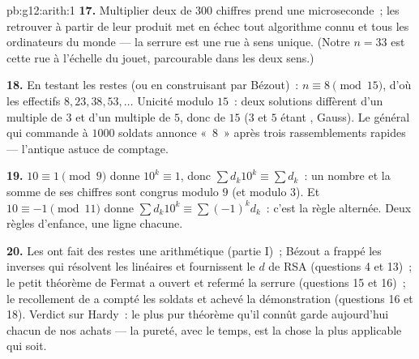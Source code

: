 \begin{solution}{pb:g12:arith:1}
\textbf{17.} Multiplier deux  de $300$ chiffres
prend une microseconde~; les retrouver à partir de leur produit met
en échec tout algorithme connu et tous les ordinateurs du monde ---
la serrure est une rue à sens unique. (Notre $n = 33$ est cette rue
à l'échelle du jouet, parcourable dans les deux sens.)

\textbf{18.} En testant les restes (ou en construisant par
Bézout)~: $n \equiv 8 \pmod{15}$, d'où les effectifs
$8, 23, 38, 53, \dots$ Unicité modulo $15$~: deux solutions
diffèrent d'un multiple de $3$ et d'un multiple de $5$, donc de
$15$ ($3$ et $5$ étant , Gauss). Le général qui
commande à $1000$ soldats annonce «~$8$~» après trois
rassemblements rapides --- l'antique astuce de comptage.

\textbf{19.} $10 \equiv 1 \pmod 9$ donne $10^k \equiv 1$, donc
$\sum d_k 10^k \equiv \sum d_k$~: un nombre et la somme de ses
chiffres sont congrus modulo $9$ (et modulo $3$). Et
$10 \equiv -1 \pmod{11}$ donne
$\sum d_k 10^k \equiv \sum (-1)^k d_k$~: c'est la règle alternée.
Deux règles d'enfance, une ligne chacune.

\textbf{20.} Les  ont fait des restes une arithmétique
(partie I)~; Bézout a frappé les inverses qui résolvent les
 linéaires et fournissent le $d$ de RSA (questions 4 et
13)~; le petit théorème de Fermat a ouvert et refermé la serrure
(questions 15 et 16)~; le recollement de  
a compté les soldats et achevé la démonstration (questions 16 et
18). Verdict sur Hardy~: le plus pur théorème qu'il connût garde
aujourd'hui chacun de nos achats --- la pureté, avec le temps, est
la chose la plus applicable qui soit.
\end{solution}
